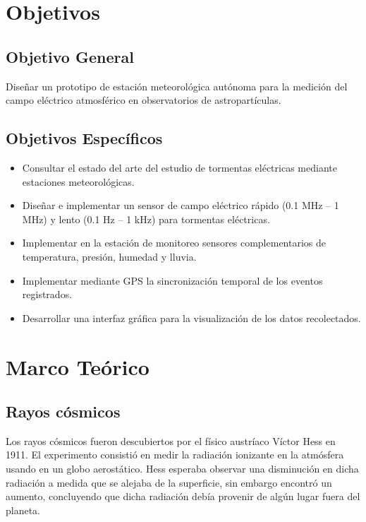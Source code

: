 \documentclass[12pt,a4paper,oneside]{book}
\begin{document}
\chapter{Objetivos}
\section{\textbf{Objetivo General}}

Diseñar un prototipo de estación meteorológica autónoma para la medición del campo eléctrico atmosférico en observatorios de astropartículas.


\section{\textbf{Objetivos Específicos}}

\begin{itemize}
    \item Consultar el estado del arte del estudio de tormentas eléctricas mediante estaciones meteorológicas.
    \item Diseñar e implementar un sensor de campo eléctrico rápido (0.1 MHz $–$ 1 MHz) y lento (0.1 Hz $–$ 1 kHz) para tormentas eléctricas.
    \item Implementar en la estación de monitoreo sensores complementarios de temperatura, presión, humedad y lluvia.
    \item Implementar mediante GPS la sincronización temporal de los eventos registrados.
    \item Desarrollar una interfaz gráfica para la visualización de los datos recolectados.
\end{itemize}

\newpage
\chapter{Marco Teórico}

\section{Rayos cósmicos}

Los rayos cósmicos fueron descubiertos por el físico austríaco Víctor Hess en 1911. El experimento consistió en medir la radiación ionizante en la atmósfera usando en un globo aerostático. Hess esperaba observar una disminución en dicha radiación a medida que se alejaba de la superficie, sin embargo encontró un aumento, concluyendo que dicha radiación debía provenir de algún lugar fuera del planeta.\medskip
\end{document}
